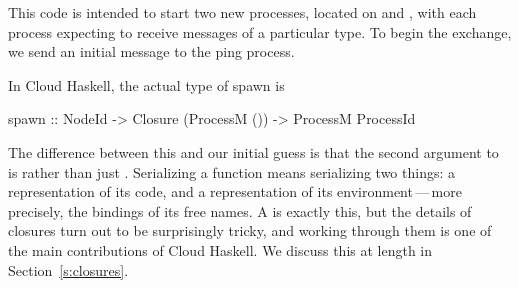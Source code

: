 \documentclass[preprint]{sigplanconf}
\begin{document}
This code is intended to start two new processes, located on  and , with each process expecting to receive messages of a particular type. To begin the exchange, we send an initial  message to the ping process.

In Cloud Haskell, the actual type of spawn is
\begin{code}
spawn :: NodeId -> Closure (ProcessM ()) 
      		-> ProcessM ProcessId
\end{code}
\noindent
The difference between this and our initial guess is that the second argument to  is  rather than just .
Serializing a function means serializing two things: a representation of its code, and a representation of its environment\,---\,more precisely, the bindings of its free names.
A  is exactly this, but the details of closures turn out to be surprisingly tricky, and working through them is one of the main contributions of Cloud Haskell.
We discuss this at length in Section~\ref{s:closures}.
\label{s:closureForeshadow}
\end{document}
